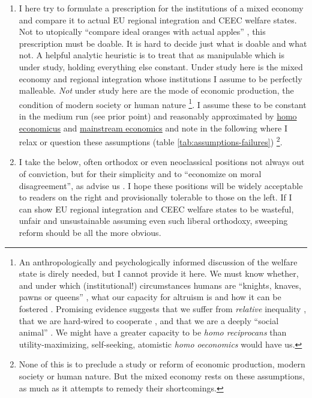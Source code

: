 \documentclass[11pt,a4paper,oneside,openright]{article}
\begin{document}
\begin{enumerate}
\begin{enumerate}
		\item I here try to formulate a prescription for the institutions of a mixed economy and compare it to actual \gls{EU} regional integration and \gls{CEEC} welfare states. 
		Not to utopically ``compare ideal oranges with actual apples'' \citep[84]{Dahl-1989-aa}, this prescription must be doable. 
		It is hard to decide just what is doable and what not. 
		A helpful analytic heuristic is to treat that as manipulable which is under study, holding everything else constant. 
		Under study here is the mixed economy and regional integration whose institutions I assume to be perfectly malleable. 
		\emph{Not} under study here are the mode of economic production, the condition of modern society or human nature
			\footnote{
				An anthropologically and psychologically informed discussion of the welfare state is direly needed, but I cannot provide it here. 
				We must know whether, and under which (institutional!) circumstances humans are ``knights, knaves, pawns or queens'' \citep{LeGrand2003}, what our capacity for altruism is \citep{Henrich2007} and how it can be fostered \citep{Axelrod1981a}. 
				Promising evidence suggests that we suffer from \emph{relative} inequality \citep{Pickett-2009-kx}, that we are hard-wired to cooperate \citep{Zak2011}, and that we are a deeply ``social animal'' \citep{Brooks2011}. 
				We might have a greater capacity to be \emph{homo reciprocans} than utility-maximizing, self-seeking, atomistic \emph{homo oeconomics} would have us.
			}.
		I assume these to be constant in the medium run (see prior point) and reasonably approximated by \hyperref[it:homo-economicus]{homo economicus} and \hyperref[sec:perfect-competition]{mainstream economics} and note in the following where I relax or question these assumptions (table \ref{tab:assumptions-failures})
		\footnote{
			None of this is to preclude a study or reform of economic production, modern society or human nature. 
			But the mixed economy rests on these assumptions, as much as it attempts to remedy their shortcomings.
		}. 
		
		\item {} \label{it:economize-moral} I take the below, often orthodox or even neoclassical positions not always out of conviction, but for their simplicity and to ``economize on moral disagreement'', as \citeauthor{GutmannThompson-2004-aa} advise us \citeyearpar[7, K226]{GutmannThompson-2004-aa}. 
		I hope these positions will be widely acceptable to readers on the right and provisionally tolerable to those on the left. 
		If I can show \gls{EU} regional integration and \gls{CEEC} welfare states to be wasteful, unfair and unsustainable assuming even such liberal orthodoxy, sweeping reform should be all the more obvious.
		
		
	\end{enumerate}
\end{enumerate}
\end{document}
